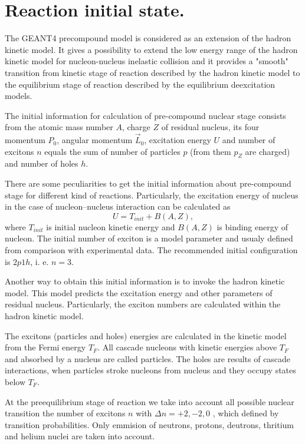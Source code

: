 \section{Reaction initial state.}

\hspace{1.0em} The GEANT4 precompound model is considered as an extension 
of the hadron kinetic model. It gives a possibility to extend the low 
energy range of the hadron kinetic model for
nucleon-nucleus inelastic collision and it provides a "smooth" transition 
from kinetic stage of reaction described by the hadron kinetic model to 
the equilibrium stage of reaction described by the equilibrium deexcitation 
models. 

The initial information for calculation of pre-compound
nuclear stage consists from the atomic mass number $A$, charge $Z$ of residual
 nucleus, its four momentum $P_0$, angular 
momentum $\vec{L}_0$,
excitation energy $U$ and number of
excitons $n$ equals the sum of number of particles $p$ (from them $p_Z$
are charged) and number of holes $h$.

There are some peculiarities to get the initial information about pre-compound 
stage 
 for different kind of reactions. Particularly,
the excitation energy of nucleus in the case of nucleon--nucleus interaction 
can be calculated as
\begin{equation}
\label{RISPM1} U = T_{init} + B(A,Z),
\end{equation}
where $T_{init}$ is initial nucleon kinetic energy and $B(A,Z)$ is 
binding energy of nucleon. The initial number of exciton is a model 
parameter and usualy defined from comparison with experimental data. The 
recommended initial configuration is $2p1h$, i. e. $n=3$.

Another way to obtain this initial information is to invoke the hadron 
kinetic model. This model predicts the excitation energy and other parameters 
of residual nucleus. Particularly, the exciton numbers are calculated within 
the hadron kinetic model.

The excitons (particles and holes) energies are calculated in the kinetic 
 model from
the Fermi energy $T_F$.
All cascade nucleons with kinetic energies above $T_{F}$ and absorbed 
by a nucleus are called particles.
The holes are results of cascade interactions, when particles stroke
nucleons from nucleus and they occupy states below $T_{F}$.

At the preequilibrium stage of reaction we take into account all
possible nuclear transition the number of excitons $n$ with $\Delta n =
+2, -2, 0$ \cite{GMT83}, which defined by transition probabilities. 
 Only emmision of neutrons, protons, deutrons, thritium and helium nuclei
  are taken
into account.
